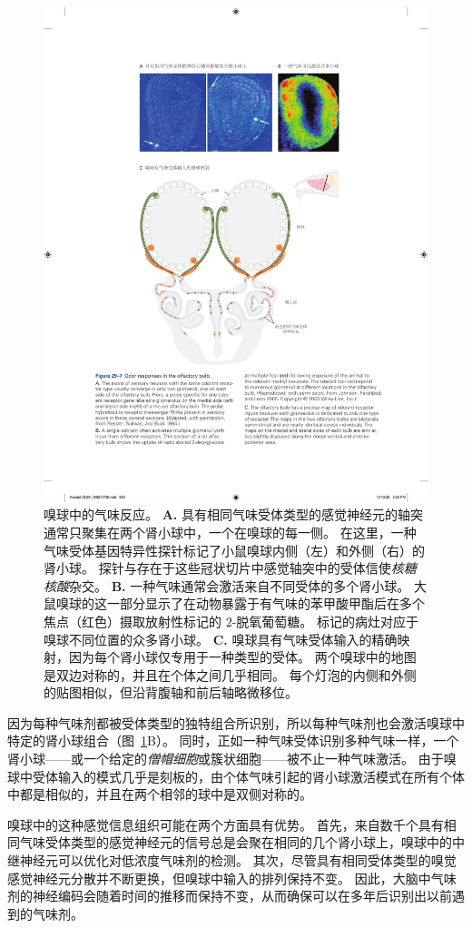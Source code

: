 \begin{figure}[htbp]
	\centering
	\includegraphics[width=0.7\linewidth]{chap29/fig_29_7}
	\caption{嗅球中的气味反应。
		\textbf{A.} 具有相同气味受体类型的感觉神经元的轴突通常只聚集在两个肾小球中，一个在嗅球的每一侧。
		在这里，一种气味受体基因特异性探针标记了小鼠嗅球内侧（左）和外侧（右）的肾小球。
		探针与存在于这些冠状切片中感觉轴突中的受体信使\textit{核糖核酸}杂交\cite{ressler1994information}。
		\textbf{B.} 一种气味通常会激活来自不同受体的多个肾小球。
		大鼠嗅球的这一部分显示了在动物暴露于有气味的苯甲酸甲酯后在多个焦点（红色）摄取放射性标记的 2-脱氧葡萄糖。
		标记的病灶对应于嗅球不同位置的众多肾小球\cite{johnson2005interactions}。
		\textbf{C.} 嗅球具有气味受体输入的精确映射，因为每个肾小球仅专用于一种类型的受体。
		两个嗅球中的地图是双边对称的，并且在个体之间几乎相同。
		每个灯泡的内侧和外侧的贴图相似，但沿背腹轴和前后轴略微移位。}
	\label{fig:29_7}
\end{figure}


因为每种气味剂都被受体类型的独特组合所识别，所以每种气味剂也会激活嗅球中特定的肾小球组合（图~\ref{fig:29_7}B）。
同时，正如一种气味受体识别多种气味一样，一个肾小球——或一个给定的\textit{僧帽细胞}或簇状细胞——被不止一种气味激活。
由于嗅球中受体输入的模式几乎是刻板的，由个体气味引起的肾小球激活模式在所有个体中都是相似的，并且在两个相邻的球中是双侧对称的。


嗅球中的这种感觉信息组织可能在两个方面具有优势。
首先，来自数千个具有相同气味受体类型的感觉神经元的信号总是会聚在相同的几个肾小球上，嗅球中的中继神经元可以优化对低浓度气味剂的检测。
其次，尽管具有相同受体类型的嗅觉感觉神经元分散并不断更换，但嗅球中输入的排列保持不变。
因此，大脑中气味剂的神经编码会随着时间的推移而保持不变，从而确保可以在多年后识别出以前遇到的气味剂。


